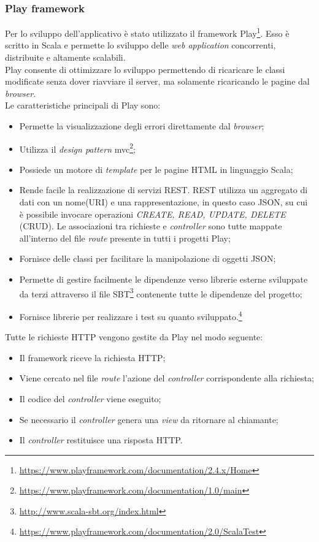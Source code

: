 \subsubsection*{Play framework}
Per lo sviluppo dell'applicativo è stato utilizzato il \gls{framework} Play\footnote{\url{https://www.playframework.com/documentation/2.4.x/Home}}. Esso è scritto in Scala e permette lo sviluppo delle \textit{web application} concorrenti, distribuite e altamente scalabili. \\
Play consente di ottimizzare lo sviluppo permettendo di ricaricare le classi modificate senza dover riavviare il server, ma solamente ricaricando le pagine dal \textit{browser}.\\
Le caratteristiche principali di Play sono:
\begin{itemize}
	\item Permette la visualizzazione degli errori direttamente dal \textit{browser};
	\item Utilizza il \textit{design pattern} \gls{mvc}\footnote{\url{https://www.playframework.com/documentation/1.0/main}};
	\item Possiede un motore di \textit{template} per le pagine HTML in linguaggio Scala;
	\item Rende facile la realizzazione di servizi \gls{REST}. \gls{REST} utilizza un aggregato di dati con un nome(\gls{URI}) e una rappresentazione, in questo caso \gls{JSON}, su cui è possibile invocare operazioni \textit{CREATE, READ, UPDATE, DELETE} (CRUD). Le associazioni tra richieste e \textit{controller} sono tutte mappate all'interno del file \textit{route} presente in tutti i progetti Play;
	\item Fornisce delle classi per facilitare la manipolazione di oggetti \gls{JSON};
	\item Permette di gestire facilmente le dipendenze verso librerie esterne sviluppate da terzi attraverso il file SBT\footnote{\url{http://www.scala-sbt.org/index.html}} contenente tutte le dipendenze del progetto;
	\item Fornisce librerie per realizzare i test su quanto sviluppato.\footnote{\url{https://www.playframework.com/documentation/2.0/ScalaTest}}
\end{itemize}
Tutte le richieste HTTP vengono gestite da Play nel modo seguente:
\begin{itemize}
	\item Il \gls{framework} riceve la richiesta HTTP;
	\item Viene cercato nel file \textit{route} l'azione del \textit{controller} corrispondente alla richiesta;
	\item Il codice del \textit{controller} viene eseguito;
	\item Se necessario il \textit{controller} genera una \textit{view} da ritornare al chiamante;
	\item Il \textit{controller} restituisce una risposta HTTP.
\end{itemize}

